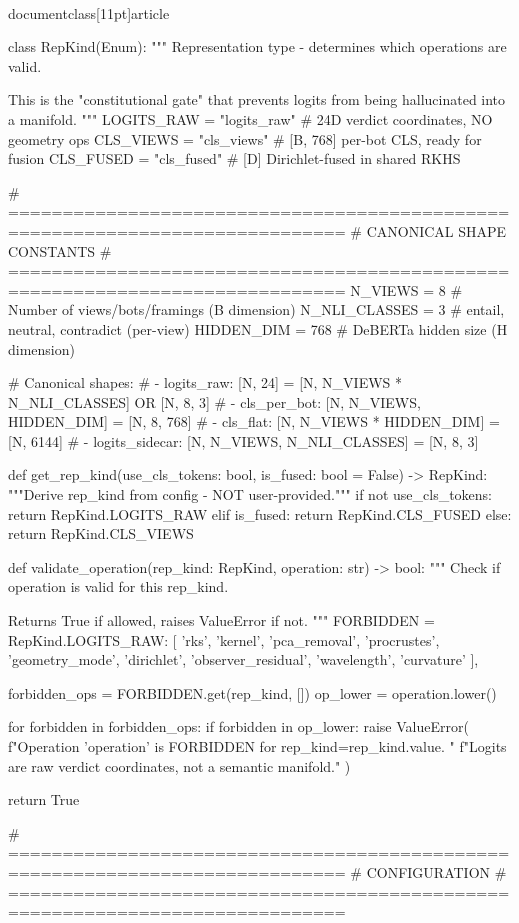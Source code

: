 \\documentclass[11pt]{article}
\begin{document}
\begin{CodeBlock}
class RepKind(Enum):
    """
    Representation type - determines which operations are valid.
    
    This is the "constitutional gate" that prevents logits from being
    hallucinated into a manifold.
    """
    LOGITS_RAW = "logits_raw"      # 24D verdict coordinates, NO geometry ops
    CLS_VIEWS = "cls_views"        # [B, 768] per-bot CLS, ready for fusion
    CLS_FUSED = "cls_fused"        # [D] Dirichlet-fused in shared RKHS


# =============================================================================
# CANONICAL SHAPE CONSTANTS
# =============================================================================
N_VIEWS = 8           # Number of views/bots/framings (B dimension)
N_NLI_CLASSES = 3     # entail, neutral, contradict (per-view)
HIDDEN_DIM = 768      # DeBERTa hidden size (H dimension)

# Canonical shapes:
# - logits_raw: [N, 24] = [N, N_VIEWS * N_NLI_CLASSES]  OR  [N, 8, 3]
# - cls_per_bot: [N, N_VIEWS, HIDDEN_DIM] = [N, 8, 768]
# - cls_flat: [N, N_VIEWS * HIDDEN_DIM] = [N, 6144]
# - logits_sidecar: [N, N_VIEWS, N_NLI_CLASSES] = [N, 8, 3]


def get_rep_kind(use_cls_tokens: bool, is_fused: bool = False) -> RepKind:
    """Derive rep_kind from config - NOT user-provided."""
    if not use_cls_tokens:
        return RepKind.LOGITS_RAW
    elif is_fused:
        return RepKind.CLS_FUSED
    else:
        return RepKind.CLS_VIEWS


def validate_operation(rep_kind: RepKind, operation: str) -> bool:
    """
    Check if operation is valid for this rep_kind.
    
    Returns True if allowed, raises ValueError if not.
    """
    FORBIDDEN = {
        RepKind.LOGITS_RAW: [
            'rks', 'kernel', 'pca_removal', 'procrustes', 
            'geometry_mode', 'dirichlet', 'observer_residual',
            'wavelength', 'curvature'
        ],
    }
    
    forbidden_ops = FORBIDDEN.get(rep_kind, [])
    op_lower = operation.lower()
    
    for forbidden in forbidden_ops:
        if forbidden in op_lower:
            raise ValueError(
                f"Operation '{operation}' is FORBIDDEN for rep_kind={rep_kind.value}. "
                f"Logits are raw verdict coordinates, not a semantic manifold."
            )
    
    return True


# =============================================================================
# CONFIGURATION
# =============================================================================


\end{CodeBlock}
\end{document}
